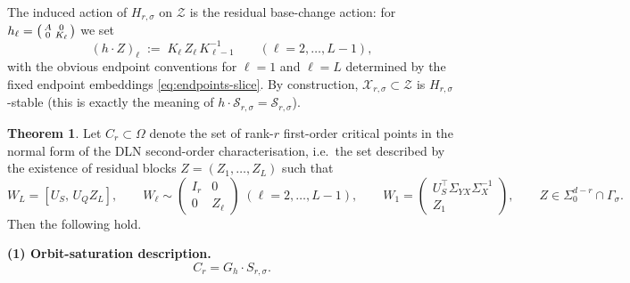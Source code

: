 \documentclass{article}
\theoremstyle{definition}
\newtheorem{theorem}{Theorem}[section]
\begin{document}
The induced action of $H_{r,\sigma}$ on $\mathcal Z$ is the residual base-change action:
for $h_\ell=\begin{psmallmatrix}A&0\\0&K_\ell\end{psmallmatrix}$ we set
\begin{equation}\label{eq:Hrsigma-on-Z}
(h\cdot Z)_\ell \;:=\; K_\ell\, Z_\ell\, K_{\ell-1}^{-1}
\qquad (\ell=2,\dots,L-1),
\end{equation}
with the obvious endpoint conventions for $\ell=1$ and $\ell=L$ determined by the fixed endpoint embeddings
\eqref{eq:endpoints-slice}.
By construction, $\mathcal X_{r,\sigma}\subset \mathcal Z$ is $H_{r,\sigma}$-stable (this is exactly the meaning of
$h\cdot \mathcal S_{r,\sigma}=\mathcal S_{r,\sigma}$).
\begin{theorem}\label{thm:critical-bundle}
Let $C_r \subset \Omega$ denote the set of rank-$r$ first-order critical points in the normal form of the DLN second-order characterisation, i.e.\ the set described by the existence of residual blocks $Z = (Z_1, \dots, Z_L)$ such that
\[
W_L = [U_S,\, U_Q Z_L], \qquad
W_\ell \sim \begin{pmatrix} I_r & 0 \\ 0 & Z_\ell \end{pmatrix}
\;(\ell = 2, \dots, L{-}1), \qquad
W_1 = \begin{pmatrix} U_S^\top \Sigma_{YX}\Sigma_X^{-1} \\ Z_1 \end{pmatrix},
\qquad Z \in \Sigma_0^{d-r} \cap \Gamma_\sigma.
\]
Then the following hold.

\medskip\noindent
\textbf{(1) Orbit-saturation description.}
\begin{equation}\tag{22}
C_r = G_h \cdot S_{r,\sigma}.
\end{equation}


\end{theorem}
\end{document}
